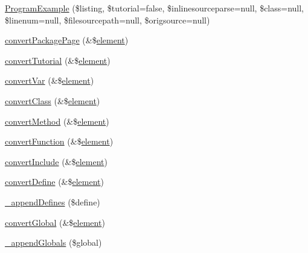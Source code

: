 \begin{DoxyCompactItemize}
\hyperlink{class_x_m_l_doc_bookpeardoc2_converter_aeb79f7e38fa701b22398a0bad11b8e40}{\-Program\-Example} (\$listing, \$tutorial=false, \$inlinesourceparse=null, \$class=null, \$linenum=null, \$filesourcepath=null, \$origsource=null)
\item 
\hyperlink{class_x_m_l_doc_bookpeardoc2_converter_a0fec4277d9e989c2654a44b73de386d3}{convert\-Package\-Page} (\&\$\hyperlink{bug-904820_8php_aa94081298ab2dfd0f261cce6c203d9aa}{element})
\item 
\hyperlink{class_x_m_l_doc_bookpeardoc2_converter_a129673c76d85dfee7bd2170d59b33fba}{convert\-Tutorial} (\&\$\hyperlink{bug-904820_8php_aa94081298ab2dfd0f261cce6c203d9aa}{element})
\item 
\hyperlink{class_x_m_l_doc_bookpeardoc2_converter_ac5907fa8ea3429f4823e8f937b5a98c1}{convert\-Var} (\&\$\hyperlink{bug-904820_8php_aa94081298ab2dfd0f261cce6c203d9aa}{element})
\item 
\hyperlink{class_x_m_l_doc_bookpeardoc2_converter_afec21ed9dd3b8ac7495c4d6d5741d7af}{convert\-Class} (\&\$\hyperlink{bug-904820_8php_aa94081298ab2dfd0f261cce6c203d9aa}{element})
\item 
\hyperlink{class_x_m_l_doc_bookpeardoc2_converter_ad2593363c9de7c36ee6f4f7de17ba94d}{convert\-Method} (\&\$\hyperlink{bug-904820_8php_aa94081298ab2dfd0f261cce6c203d9aa}{element})
\item 
\hyperlink{class_x_m_l_doc_bookpeardoc2_converter_acd30d12b8e21ce245f1b9dbbf8bf29b0}{convert\-Function} (\&\$\hyperlink{bug-904820_8php_aa94081298ab2dfd0f261cce6c203d9aa}{element})
\item 
\hyperlink{class_x_m_l_doc_bookpeardoc2_converter_a548baade863d365286d46ca66564711f}{convert\-Include} (\&\$\hyperlink{bug-904820_8php_aa94081298ab2dfd0f261cce6c203d9aa}{element})
\item 
\hyperlink{class_x_m_l_doc_bookpeardoc2_converter_a9f23827e97c2672a94ff615d9bb00601}{convert\-Define} (\&\$\hyperlink{bug-904820_8php_aa94081298ab2dfd0f261cce6c203d9aa}{element})
\item 
\hyperlink{class_x_m_l_doc_bookpeardoc2_converter_a0f994c6d63e0529a43b8bff4854ad331}{\-\_\-append\-Defines} (\$define)
\item 
\hyperlink{class_x_m_l_doc_bookpeardoc2_converter_a1d1bb2b092be87ba7a40b0064ac43b6c}{convert\-Global} (\&\$\hyperlink{bug-904820_8php_aa94081298ab2dfd0f261cce6c203d9aa}{element})
\item 
\hyperlink{class_x_m_l_doc_bookpeardoc2_converter_a7d66ade7bb93e7888eabd518fa9196a8}{\-\_\-append\-Globals} (\$global)

\end{DoxyCompactItemize}
